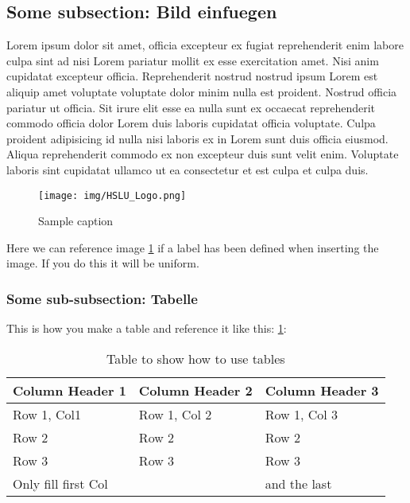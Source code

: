 \subsection{Some subsection: Bild einfuegen}
Lorem ipsum dolor sit amet, officia excepteur ex fugiat reprehenderit enim labore culpa sint ad nisi Lorem pariatur mollit ex esse exercitation amet. Nisi anim cupidatat excepteur officia. Reprehenderit nostrud nostrud ipsum Lorem est aliquip amet voluptate voluptate dolor minim nulla est proident. Nostrud officia pariatur ut officia. Sit irure elit esse ea nulla sunt ex occaecat reprehenderit commodo officia dolor Lorem duis laboris cupidatat officia voluptate. Culpa proident adipisicing id nulla nisi laboris ex in Lorem sunt duis officia eiusmod. Aliqua reprehenderit commodo ex non excepteur duis sunt velit enim. Voluptate laboris sint cupidatat ullamco ut ea consectetur et est culpa et culpa duis.

\begin{figure}[h]
\centering
\texttt{[image: img/HSLU\_Logo.png]}
\caption{Sample caption}
\label{fig:hslu-logo}
\end{figure}

Here we can reference image \ref{fig:hslu-logo} if a label has been defined when inserting the image. If you do this it will be uniform.

\subsubsection{Some sub-subsection: Tabelle}

This is how you make a table and reference it like this: \ref{table:template}:

\begin{table}[h!]
\centering
\begin{tabular}{ |l| l| l|} %
  \textbf{Column Header 1} & \textbf{Column Header 2} &  \textbf{Column Header 3}\\
  \hline
  
  Row 1, Col1 & Row 1, Col 2 & Row 1, Col 3\\

  Row 2 &Row 2 & Row 2 \\
  
  Row 3 & Row 3 & Row 3 \\
  
  
  Only fill first Col && and the last\\
\end{tabular}
\caption{Table to show how to use tables}
\label{table:template}
\end{table}

